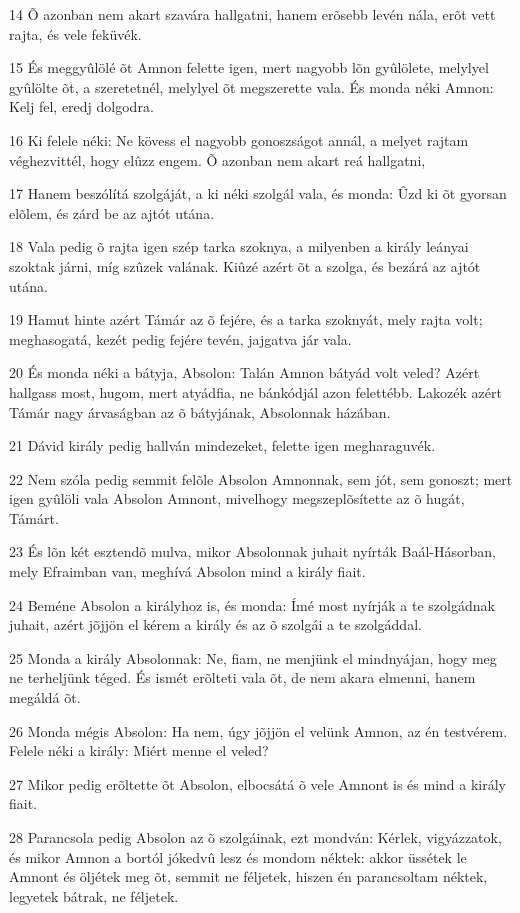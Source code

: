 \par 14 Õ azonban nem akart szavára hallgatni, hanem erõsebb levén nála, erõt vett rajta, és vele feküvék.
\par 15 És meggyûlölé õt Amnon felette igen, mert nagyobb lõn gyûlölete, melylyel gyûlölte õt, a szeretetnél, melylyel õt megszerette vala. És monda néki Amnon: Kelj fel, eredj dolgodra.
\par 16 Ki felele néki: Ne kövess el nagyobb gonoszságot annál, a melyet rajtam véghezvittél, hogy elûzz engem. Õ azonban nem akart reá hallgatni,
\par 17 Hanem beszólítá szolgáját, a ki néki szolgál vala, és monda: Ûzd ki õt gyorsan elõlem, és zárd be az ajtót utána.
\par 18 Vala pedig õ rajta igen szép tarka szoknya, a milyenben a király leányai szoktak járni, míg szûzek valának. Kiûzé azért õt a szolga, és bezárá az ajtót utána.
\par 19 Hamut hinte azért Támár az õ fejére, és a tarka szoknyát, mely rajta volt;  meghasogatá, kezét pedig fejére tevén, jajgatva jár vala.
\par 20 És monda néki a bátyja, Absolon: Talán Amnon bátyád volt veled? Azért hallgass most, hugom, mert atyádfia, ne bánkódjál azon felettébb. Lakozék azért Támár nagy árvaságban az õ bátyjának, Absolonnak házában.
\par 21 Dávid király pedig hallván mindezeket, felette igen megharaguvék.
\par 22 Nem szóla pedig semmit felõle Absolon Amnonnak, sem jót, sem gonoszt; mert igen gyûlöli vala Absolon Amnont, mivelhogy megszeplõsítette az õ hugát, Támárt.
\par 23 És lõn két esztendõ mulva, mikor Absolonnak juhait nyírták Baál-Hásorban, mely Efraimban van, meghívá Absolon mind a király fiait.
\par 24 Beméne Absolon a királyhoz is, és monda: Ímé most nyírják a te szolgádnak juhait, azért jõjjön el kérem a király és az õ szolgái a te szolgáddal.
\par 25 Monda a király Absolonnak: Ne, fiam, ne menjünk el mindnyájan, hogy meg ne terheljünk téged. És ismét erõlteti vala õt, de nem akara elmenni, hanem megáldá õt.
\par 26 Monda mégis Absolon: Ha nem, úgy jõjjön el velünk Amnon, az én testvérem. Felele néki a király: Miért menne el veled?
\par 27 Mikor pedig erõltette õt Absolon, elbocsátá õ vele Amnont is és mind a király fiait.
\par 28 Parancsola pedig Absolon az õ szolgáinak, ezt mondván: Kérlek, vigyázzatok, és mikor Amnon a bortól jókedvû lesz és mondom néktek: akkor üssétek le Amnont és öljétek meg õt, semmit ne féljetek, hiszen én parancsoltam néktek, legyetek bátrak, ne féljetek.

